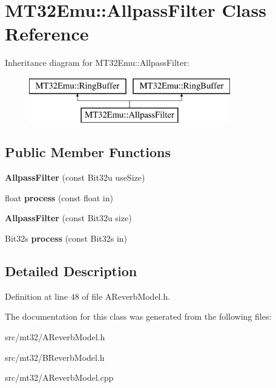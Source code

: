 \hypertarget{classMT32Emu_1_1AllpassFilter}{\section{M\-T32\-Emu\-:\-:Allpass\-Filter Class Reference}
\label{classMT32Emu_1_1AllpassFilter}
}
Inheritance diagram for M\-T32\-Emu\-:\-:Allpass\-Filter\-:\begin{figure}[H]
\begin{center}
\leavevmode
\includegraphics[height=2.000000cm]{classMT32Emu_1_1AllpassFilter}
\end{center}
\end{figure}
\subsection*{Public Member Functions}
\begin{DoxyCompactItemize}
\item 
\hypertarget{classMT32Emu_1_1AllpassFilter_ae33b99c606974900a30f58fea092cd5a}{{\bfseries Allpass\-Filter} (const Bit32u use\-Size)}\label{classMT32Emu_1_1AllpassFilter_ae33b99c606974900a30f58fea092cd5a}

\item 
\hypertarget{classMT32Emu_1_1AllpassFilter_a6241e1826d39ac1978d0ee8bac331710}{float {\bfseries process} (const float in)}\label{classMT32Emu_1_1AllpassFilter_a6241e1826d39ac1978d0ee8bac331710}

\item 
\hypertarget{classMT32Emu_1_1AllpassFilter_a53ff10b78ac88570a86e8b0a45e5a56b}{{\bfseries Allpass\-Filter} (const Bit32u size)}\label{classMT32Emu_1_1AllpassFilter_a53ff10b78ac88570a86e8b0a45e5a56b}

\item 
\hypertarget{classMT32Emu_1_1AllpassFilter_a77022f6804451a2b071df08c59016ee1}{Bit32s {\bfseries process} (const Bit32s in)}\label{classMT32Emu_1_1AllpassFilter_a77022f6804451a2b071df08c59016ee1}

\end{DoxyCompactItemize}


\subsection{Detailed Description}


Definition at line 48 of file A\-Reverb\-Model.\-h.



The documentation for this class was generated from the following files\-:\begin{DoxyCompactItemize}
\item 
src/mt32/A\-Reverb\-Model.\-h\item 
src/mt32/B\-Reverb\-Model.\-h\item 
src/mt32/A\-Reverb\-Model.\-cpp\end{DoxyCompactItemize}
